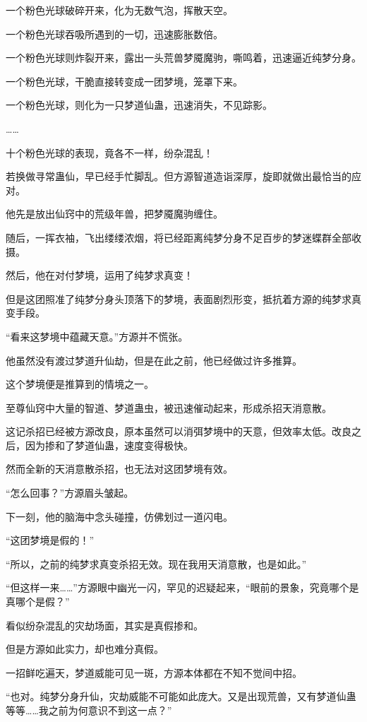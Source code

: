 \begin{this_body}
一个粉色光球破碎开来，化为无数气泡，挥散天空。

一个粉色光球吞吸所遇到的一切，迅速膨胀数倍。

一个粉色光球则炸裂开来，露出一头荒兽梦魇魔驹，嘶鸣着，迅速逼近纯梦分身。

一个粉色光球，干脆直接转变成一团梦境，笼罩下来。

一个粉色光球，则化为一只梦道仙蛊，迅速消失，不见踪影。

……

十个粉色光球的表现，竟各不一样，纷杂混乱！

若换做寻常蛊仙，早已经手忙脚乱。但方源智道造诣深厚，旋即就做出最恰当的应对。

他先是放出仙窍中的荒级年兽，把梦魇魔驹缠住。

随后，一挥衣袖，飞出缕缕浓烟，将已经距离纯梦分身不足百步的梦迷蝶群全部收摄。

然后，他在对付梦境，运用了纯梦求真变！

但是这团照准了纯梦分身头顶落下的梦境，表面剧烈形变，抵抗着方源的纯梦求真变手段。

“看来这梦境中蕴藏天意。”方源并不慌张。

他虽然没有渡过梦道升仙劫，但是在此之前，他已经做过许多推算。

这个梦境便是推算到的情境之一。

至尊仙窍中大量的智道、梦道蛊虫，被迅速催动起来，形成杀招天消意散。

这记杀招已经被方源改良，原本虽然可以消弭梦境中的天意，但效率太低。改良之后，因为掺和了梦道仙蛊，速度变得极快。

然而全新的天消意散杀招，也无法对这团梦境有效。

“怎么回事？”方源眉头皱起。

下一刻，他的脑海中念头碰撞，仿佛划过一道闪电。

“这团梦境是假的！”

“所以，之前的纯梦求真变杀招无效。现在我用天消意散，也是如此。”

“但这样一来……”方源眼中幽光一闪，罕见的迟疑起来，“眼前的景象，究竟哪个是真哪个是假？”

看似纷杂混乱的灾劫场面，其实是真假掺和。

但是方源如此实力，却也难分真假。

一招鲜吃遍天，梦道威能可见一斑，方源本体都在不知不觉间中招。

“也对。纯梦分身升仙，灾劫威能不可能如此庞大。又是出现荒兽，又有梦道仙蛊等等……我之前为何意识不到这一点？”


\end{this_body}
